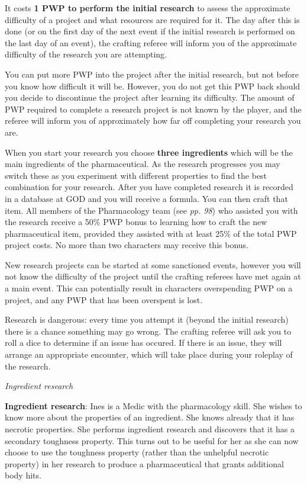 It costs \textbf{1 PWP to perform the initial research} to assess the approximate difficulty of a project and what resources are required for it. The day after this is done (or on the first day of the next event if the initial research is performed on the last day of an event), the crafting referee will inform you of the approximate difficulty of the research you are attempting.

You can put more PWP into the project after the initial research, but not before you know how difficult it will be. However, you do not get this PWP back should you decide to discontinue the project after learning its difficulty. The amount of PWP required to complete a research project is not known by the player, and the referee will inform you of approximately how far off completing your research you are.

When you start your research you choose \textbf{three ingredients} which will be the main ingredients of the pharmaceutical. As the research progresses you may switch these as you experiment with different properties to find the best combination for your research. After you have completed research it is recorded in a database at GOD and you will receive a formula. You can then craft that item. All members of the Pharmacology team (see \textit{pp. 98}) who assisted you with the research receive a 50\% PWP bonus to learning how to craft the new pharmaceutical item, provided they assisted with at least 25\% of the total PWP project costs. No more than two characters may receive this bonus.

New research projects can be started at some sanctioned events, however you will not know the difficulty of the project until the crafting referees have met again at a main event. This can potentially result in characters overspending PWP on a project, and any PWP that has been overspent is lost.

Research is dangerous: every time you attempt it (beyond the initial research) there is a chance something may go wrong. The crafting referee will ask you to roll a dice to determine if an issue has occured. If there is an issue, they will arrange an appropriate encounter, which will take place during your roleplay of the research.

\textit{Ingredient research}

\textbf{Ingredient research}: Ines is a Medic with the pharmacology skill. She wishes to know more about the properties of an ingredient. She knows already that it has necrotic properties. She performs ingredient research and discovers that it has a secondary toughness property. This turns out to be useful for her as she can now choose to use the toughness property (rather than the unhelpful necrotic property) in her research to produce a pharmaceutical that grants additional body hits.

